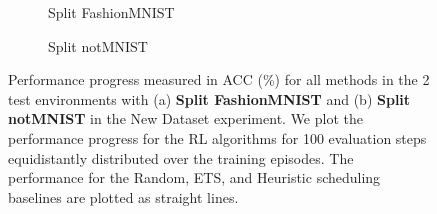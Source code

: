 \begin{figure}[t]
	\centering
	\setlength{\figwidth}{0.26\textwidth}
	\setlength{\figheight}{.14\textheight}
	\begin{subfigure}[t]{0.48\textwidth}
		\centering
		
		\vspace{-4mm} %
		\caption{Split FashionMNIST}
		\label{fig:rewards_fashionmnist_2envs}
	\end{subfigure}%
	\begin{subfigure}[t]{0.48\textwidth}
		\centering
		
		\caption{Split notMNIST}
		\label{fig:rewards_notmnist_2envs}
	\end{subfigure}
	\vspace{-1mm}
	\caption{Performance progress measured in ACC (\%) for all methods in the 2 test environments with (a) {\bf Split FashionMNIST} and (b) {\bf Split notMNIST} in the New Dataset experiment. We plot the performance progress for the RL algorithms for 100 evaluation steps equidistantly distributed over the training episodes. The performance for the Random, ETS, and Heuristic scheduling baselines are plotted as straight lines.  }
	\label{fig:rewards_new_dataset_2envs}
	\vspace{-2mm}
\end{figure}

\vspace{-3mm}
